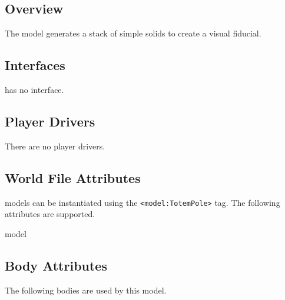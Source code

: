 
\subsection{Overview}

The {\tt \modelName} model generates a stack of simple solids to create a visual fiducial.

\subsection{\libgazebo Interfaces}

{\tt \modelName} has no \libgazebo interface.

\subsection{Player Drivers}

There are no player drivers.

\subsection{World File Attributes}

{\tt \modelName} models can be instantiated using the
\verb+<model:TotemPole>+ tag.  The following attributes are
supported.

\begin{xmlattrtable}{model}{\modelName}
\modeldefaults
{}
\end{xmlattrtable}

\subsection{Body Attributes}

The following bodies are used by this model.

\begin{bodyattrtable}
\bodydefaults
\end{bodyattrtable}

